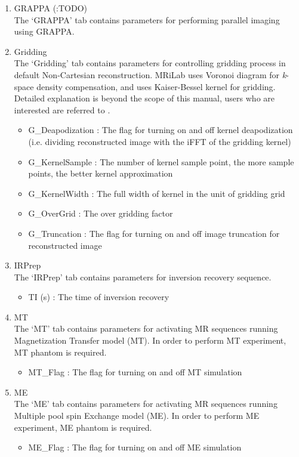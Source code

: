 \documentclass{book}%
\begin{document}
\begin{enumerate}
  \item GRAPPA (:TODO) \\
	The `GRAPPA' tab contains parameters for performing parallel imaging using GRAPPA.
	
  \item Gridding \\
	The `Gridding' tab contains parameters for controlling gridding process in default Non-Cartesian reconstruction. MRiLab uses Voronoi diagram for \textit{k}-space density compensation, and uses Kaiser-Bessel kernel for gridding. Detailed explanation is beyond the scope of this manual, users who are interested are referred to \cite{Jackson1991,VRasche1999,Beatty2005}.
		\begin{itemize}
			\item G\_Deapodization : The flag for turning on and off kernel deapodization (i.e. dividing reconstructed image with the iFFT of the gridding kernel)
			\item G\_KernelSample : The number of kernel sample point, the more sample points, the better kernel approximation
			\item G\_KernelWidth : The full width of kernel in the unit of gridding grid
			\item G\_OverGrid : The over gridding factor
			\item G\_Truncation : The flag for turning on and off image truncation for reconstructed image
		\end{itemize}
	
	\item IRPrep \\
	The `IRPrep' tab contains parameters for inversion recovery sequence.
		\begin{itemize}
			\item TI (s) : The time of inversion recovery
		\end{itemize}
		
	\item MT \\
	The `MT' tab contains parameters for activating MR sequences running Magnetization Transfer model (MT). In order to perform MT experiment, MT phantom is required.
		\begin{itemize}
			\item MT\_Flag : The flag for turning on and off MT simulation
		\end{itemize}
		
	\item ME \\
	The `ME' tab contains parameters for activating MR sequences running Multiple pool spin Exchange model (ME). In order to perform ME experiment, ME phantom is required.
	\begin{itemize}
		\item ME\_Flag : The flag for turning on and off ME simulation
	\end{itemize}
	

\end{enumerate}
\end{document}
